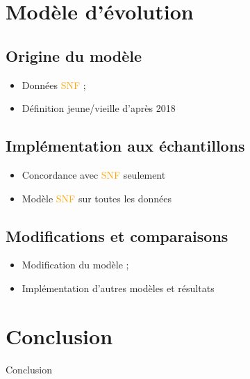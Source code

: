 \documentclass[a4paper, 12pt, svgnames]{article}
\begin{document}
\section{Modèle d'évolution}
\subsection{Origine du modèle}
\begin{itemize}
    \item Données \textcolor{orange}{SNF} ;
    \item Définition jeune/vieille d'après  2018
\end{itemize}

\subsection{Implémentation aux échantillons}
\begin{itemize}
    \item Concordance avec \textcolor{orange}{SNF} seulement
    \item Modèle \textcolor{orange}{SNF} sur toutes les données
\end{itemize}

\subsection{Modifications et comparaisons}
\begin{itemize}
    \item Modification du modèle ;
    \item Implémentation d'autres modèles et résultats
\end{itemize}

\section{Conclusion}
Conclusion



\end{document}
